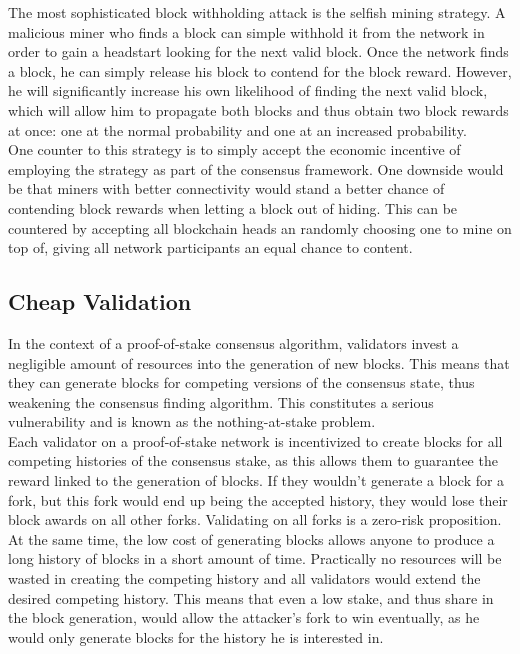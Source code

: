 \documentclass[12pt,a4paper]{article}
\begin{document}
The most sophisticated block withholding attack is the selfish mining strategy. A malicious miner who finds a block can simple withhold it from the network in order to gain a headstart looking for the next valid block. Once the network finds a block, he can simply release his block to contend for the block reward. However, he will significantly increase his own likelihood of finding the next valid block, which will allow him to propagate both blocks and thus obtain two block rewards at once: one at the normal probability and one at an increased probability.\\

One counter to this strategy is to simply accept the economic incentive of employing the strategy as part of the consensus framework. One downside would be that miners with better connectivity would stand a better chance of contending block rewards when letting a block out of hiding. This can be countered by accepting all blockchain heads an randomly choosing one to mine on top of, giving all network participants an equal chance to content.\\

\subsection{Cheap Validation}

In the context of a proof-of-stake consensus algorithm, validators invest a negligible amount of resources into the generation of new blocks. This means that they can generate blocks for competing versions of the consensus state, thus weakening the consensus finding algorithm. This constitutes a serious vulnerability and is known as the nothing-at-stake problem.\\

Each validator on a proof-of-stake network is incentivized to create blocks for all competing histories of the consensus stake, as this allows them to guarantee the reward linked to the generation of blocks. If they wouldn't generate a block for a fork, but this fork would end up being the accepted history, they would lose their block awards on all other forks. Validating on all forks is a zero-risk proposition.\\

At the same time, the low cost of generating blocks allows anyone to produce a long history of blocks in a short amount of time. Practically no resources will be wasted in creating the competing history and all validators would extend the desired competing history. This means that even a low stake, and thus share in the block generation, would allow the attacker's fork to win eventually, as he would only generate blocks for the history he is interested in.\\
\end{document}

